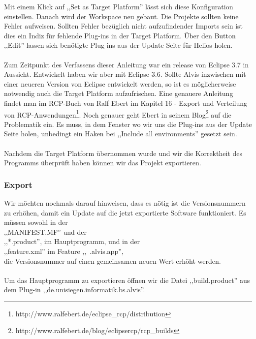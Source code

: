 \documentclass[10pt,a4paper]{article}
\begin{document}
Mit einem Klick auf ,,Set as Target Platform'' lässt sich diese Konfiguration einstellen. 
Danach wird der Workspace neu gebaut. Die Projekte sollten keine Fehler aufweisen. Sollten Fehler bezüglich nicht aufzufindender Imports sein ist dies ein Indiz für fehlende Plug-ins in der Target Platform. Über den Button ,,Edit'' lassen sich benötigte Plug-ins aus der Update Seite für Helios holen.
\\ \\
Zum Zeitpunkt des Verfassens dieser Anleitung war ein release von Eclipse 3.7 in Aussicht. Entwickelt haben wir aber  mit Eclipse 3.6. Sollte Alvis inzwischen mit einer neueren Version von Eclipse entwickelt werden, so ist es möglicherweise notwendig auch die Target Platform aufzufrischen. Eine genauere Anleitung findet man im RCP-Buch von Ralf Ebert im Kapitel 16 - Export und Verteilung von RCP-Anwendungen\footnote{http://www.ralfebert.de/eclipse\_rcp/distribution\/}. Noch genauer geht Ebert in seinem Blog\footnote{http://www.ralfebert.de/blog/eclipsercp/rcp\_builds\/} auf die Problematik ein. Es muss, in dem Fenster wo wir uns die Plug-ins aus der Update Seite holen, unbedingt ein Haken bei ,,Include all environments'' gesetzt sein.
\\ \\

Nachdem die Target Platform übernommen wurde und wir die Korrektheit des Programms überprüft haben können wir das Projekt exportieren. 
\subsubsection{Export}
Wir möchten nochmals darauf hinweisen, dass es nötig ist die Versionsnummern zu erhöhen, damit ein Update auf die jetzt exportierte Software funktioniert. Es müssen sowohl in der \\
,,MANIFEST.MF'' und der \\
,,*.product'', im Hauptprogramm, und in der \\
,,feature.xml'' im Feature ,,~.alvis.app'', \\
die Versionsnummer auf einen gemeinsamen neuen Wert erhöht werden.
\\ \\
Um das Hauptprogramm zu exportieren öffnen wir die Datei ,,build.product'' aus dem Plug-in ,,de.unisiegen.informatik.bs.alvis''.

\begin{center}
\end{center}
\end{document}
